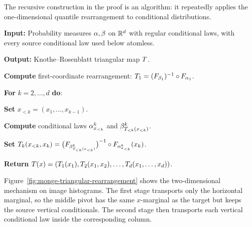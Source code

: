 The recursive construction in the proof is an algorithm: it repeatedly applies the one-dimensional quantile rearrangement to conditional distributions.

\begin{alg}\label{alg:triangular-rearrangement}
\textbf{Input:} Probability measures $\alpha,\beta$ on $\mathbb{R}^d$ with regular conditional laws, with every source conditional law used below atomless.

\textbf{Output:} Knothe--Rosenblatt triangular map $T$.

\textbf{Compute} first-coordinate rearrangement:
\(T_1=(F_{\beta_1})^{-1}\circ F_{\alpha_1}\).

\textbf{For} $k=2,\ldots,d$ \textbf{do}:
\begin{algblock}

\textbf{Set} $x_{<k}=(x_1,\ldots,x_{k-1})$.

\textbf{Compute} conditional laws $\alpha^k_{x_{<k}}$ and $\beta^k_{T_{<k}(x_{<k})}$.

\textbf{Set}
\(T_k(x_{<k},x_k) = \bigl(F_{\beta^k_{T_{<k}(x_{<k})}}\bigr)^{-1} \circ F_{\alpha^k_{x_{<k}}}(x_k)\).
\end{algblock}
\algreturnskip
\textbf{Return} \(T(x)=(T_1(x_1),T_2(x_1,x_2),\ldots,T_d(x_1,\ldots,x_d))\).
\end{alg}

Figure~\ref{fig:monge-triangular-rearrangement} shows the two-dimensional mechanism on image histograms. The first stage transports only the horizontal marginal, so the middle pivot has the same $x$-marginal as the target but keeps the source vertical conditionals. The second stage then transports each vertical conditional law inside the corresponding column.

